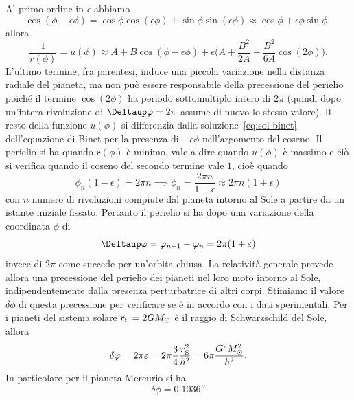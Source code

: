 Al primo ordine in $\epsilon$ abbiamo
\begin{equation}
  \cos(\phi - \epsilon\phi) = \cos\phi \cos(\epsilon\phi) + \sin\phi
  \sin(\epsilon\phi) \approx \cos\phi + \epsilon\phi\sin\phi,
\end{equation}
allora
\begin{equation}
  \frac{1}{r(\phi)} = u(\phi) \approx A + B\cos(\phi - \epsilon\phi) +
  \epsilon\bigg(A + \frac{B^{2}}{2A} - \frac{B^{2}}{6A}\cos(2\phi)\bigg).
\end{equation}
L'ultimo termine, fra parentesi, induce una piccola variazione nella distanza
radiale del pianeta, ma non può essere responsabile della precessione del
perielio poiché il termine $\cos(2\phi)$ ha periodo sottomultiplo intero di
$2\pi$ (quindi dopo un'intera rivoluzione di $\var \phi = 2\pi$ assume di nuovo
lo stesso valore).  Il resto della funzione $u(\phi)$ si differenzia dalla
soluzione~\eqref{eq:sol-binet} dell'equazione di Binet per la presenza di
$-\epsilon\phi$ nell'argomento del coseno.  Il perielio si ha quando $r(\phi)$ è
minimo, vale a dire quando $u(\phi)$ è massimo e ciò si verifica quando il
coseno del secondo termine vale $1$, cioè quando
\begin{equation}
  \phi_{n}(1 - \epsilon) = 2\pi n \implies \phi_{n} = \frac{2\pi n}{1 -
    \epsilon} \approx 2\pi n(1 + \epsilon)
\end{equation}
con $n$ numero di rivoluzioni compiute dal pianeta intorno al Sole a partire da
un istante iniziale fissato.  Pertanto il perielio si ha dopo una variazione
della coordinata $\phi$ di
\begin{equation}
  \var\phi = \phi_{n+1} - \phi_{n} = 2\pi(1 + \epsilon)
\end{equation}
invece di $2\pi$ come succede per un'orbita chiusa.  La relatività generale
prevede allora una precessione del perielio dei pianeti nel loro moto intorno al
Sole, indipendentemente dalla presenza perturbatrice di altri corpi.  Stimiamo
il valore $\delta\phi$ di questa precessione per verificare se è in accordo con
i dati sperimentali.  Per i pianeti del sistema solare
$r_{\textup{S}} = 2GM_{\odot}$ è il raggio di Schwarzschild del Sole, allora
\begin{equation}
  \delta\phi = 2\pi\epsilon = 2\pi \frac{3}{4}\frac{r_{\textup{S}}^{2}}{h^{2}} =
  6\pi \frac{G^{2}M_{\odot}^{2}}{h^{2}}.
\end{equation}
In particolare per il pianeta Mercurio si ha
\begin{equation}
  \delta\phi = \ang{;;0.1036}
\end{equation}
